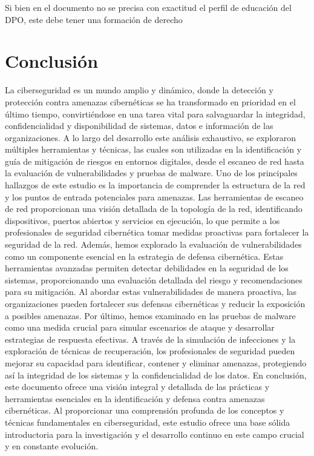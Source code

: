 \documentclass[stu, 11pt, letterpaper, donotrepeattitle, floatsintext, natbib]{apa7}
\begin{document}
 Si bien en el documento no se precisa con exactitud el perfil de educación del DPO, este debe tener una formación de derecho 


\newpage

\section{\large Conclusión}

La ciberseguridad es un mundo amplio y dinámico, donde la detección y protección contra amenazas cibernéticas se ha transformado en prioridad en el último tiempo, convirtiéndose en una tarea vital para salvaguardar la integridad, confidencialidad y disponibilidad de sistemas, datos e información de las organizaciones. A lo largo del desarrollo este análisis exhaustivo, se exploraron múltiples herramientas y técnicas, las cuales son utilizadas en la identificación y guía de mitigación de riesgos en entornos digitales, desde el escaneo de red hasta la evaluación de vulnerabilidades y pruebas de malware. 
Uno de los principales hallazgos de este estudio es la importancia de comprender la estructura de la red y los puntos de entrada potenciales para amenazas. Las herramientas de escaneo de red proporcionan una visión detallada de la topología de la red, identificando dispositivos, puertos abiertos y servicios en ejecución, lo que permite a los profesionales de seguridad cibernética tomar medidas proactivas para fortalecer la seguridad de la red. 
Además, hemos explorado la evaluación de vulnerabilidades como un componente esencial en la estrategia de defensa cibernética. Estas herramientas avanzadas permiten detectar debilidades en la seguridad de los sistemas, proporcionando una evaluación detallada del riesgo y recomendaciones para su mitigación. Al abordar estas vulnerabilidades de manera proactiva, las organizaciones pueden fortalecer sus defensas cibernéticas y reducir la exposición a posibles amenazas. 
Por último, hemos examinado en las pruebas de malware como una medida crucial para simular escenarios de ataque y desarrollar estrategias de respuesta efectivas. A través de la simulación de infecciones y la exploración de técnicas de recuperación, los profesionales de seguridad pueden mejorar su capacidad para identificar, contener y eliminar amenazas, protegiendo así la integridad de los sistemas y la confidencialidad de los datos. 
En conclusión, este documento ofrece una visión integral y detallada de las prácticas y herramientas esenciales en la identificación y defensa contra amenazas cibernéticas. Al proporcionar una comprensión profunda de los conceptos y técnicas fundamentales en ciberseguridad, este estudio ofrece una base sólida introductoria para la investigación y el desarrollo continuo en este campo crucial y en constante evolución.


\newpage
\renewcommand\refname{\large\textbf{Referencias}}

\end{document}
